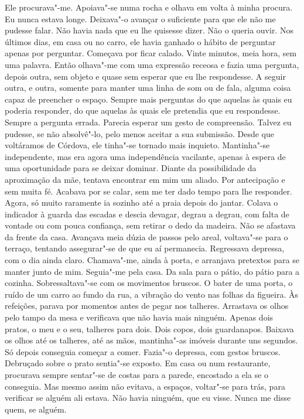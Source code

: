 Ele procurava"-me. Apoiava"-se numa rocha e olhava em volta à minha
procura. Eu nunca estava longe. Deixava"-o avançar o suficiente para que
ele não me pudesse falar. Não havia nada que eu lhe quisesse dizer. Não
o queria ouvir. Nos últimos dias, em casa ou no carro, ele havia ganhado
o hábito de perguntar apenas por perguntar. Começava por ficar calado.
Vinte minutos, meia hora, sem uma palavra. Então olhava"-me com uma
expressão receosa e fazia uma pergunta, depois outra, sem objeto e
quase sem esperar que eu lhe respondesse. A seguir outra, e outra,
somente para manter uma linha de som ou de fala, alguma coisa capaz de
preencher o espaço. Sempre mais perguntas do que aquelas às quais eu
poderia responder, do que aquelas às quais ele pretendia que eu
respondesse. Sempre a pergunta errada. Parecia esperar um gesto de
compreensão. Talvez eu pudesse, se não absolvê"-lo, pelo menos aceitar a
sua submissão. Desde que voltáramos de Córdova, ele tinha"-se tornado
mais inquieto. Mantinha"-se independente, mas era agora uma
independência vacilante, apenas à espera de uma oportunidade para se
deixar dominar. Diante da possibilidade da aproximação da mãe, tentava
encontrar em mim um aliado. Por antecipação e sem muita fé. Acabava por
se calar, sem me ter dado tempo para lhe responder. Agora, só muito
raramente ia sozinho até a praia depois do jantar. Colava o indicador à
guarda das escadas e descia devagar, degrau a degrau, com falta de
vontade ou com pouca confiança, sem retirar o dedo da madeira. Não se
afastava da frente da casa. Avançava meia dúzia de passos pelo areal,
voltava"-se para o terraço, tentando assegurar"-se de que eu aí
permanecia. Regressava depressa, com o dia ainda claro. Chamava"-me,
ainda à porta, e arranjava pretextos para se manter junto de mim.
Seguia"-me pela casa. Da sala para o pátio, do pátio para a cozinha.
Sobressaltava"-se com os movimentos bruscos. O bater de uma porta, o
ruído de um carro ao fundo da rua, a vibração do vento nas folhas da
figueira. Às refeições, parava por momentos antes de pegar nos talheres.
Arrastava os olhos pelo tampo da mesa e verificava que não havia mais
ninguém. Apenas dois pratos, o meu e o seu, talheres para dois. Dois
copos, dois guardanapos. Baixava os olhos até os talheres, até as mãos,
mantinha"-as imóveis durante uns segundos. Só depois conseguia começar a
comer. Fazia"-o depressa, com gestos bruscos. Debruçado sobre o prato
sentia"-se exposto. Em casa ou num restaurante, procurava sempre
sentar"-se de costas para a parede, encostado a ela se o conseguia. Mas
mesmo assim não evitava, a espaços, voltar"-se para trás, para verificar
se alguém ali estava. Não havia ninguém, que eu visse. Nunca me disse
quem, se alguém.

